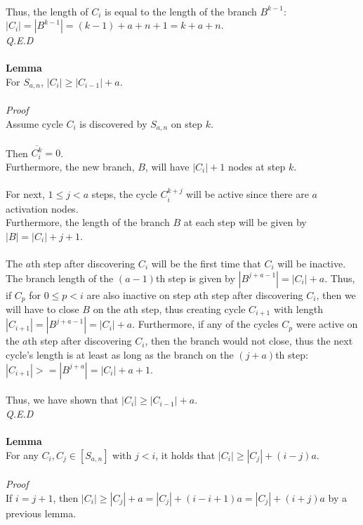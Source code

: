 \documentclass[a4paper,12pt]{article}
\begin{document}
\\ 
Thus, the length of $C_i$ is equal to the length of the branch $B^{k-1}$:\\ $|C_i| = |B^{k-1}| = (k - 1) + a + n + 1 = k + a + n$.\\
\textit{Q.E.D}\\
\\
\textbf{Lemma}\\
For $S_{a,n}$, $|C_{i}| \geq |C_{i-1}| + a$.\\
\\
\textit{Proof}\\  
Assume cycle $C_i$ is discovered by $S_{a,n}$ on step $k$.\\
\\
Then $\overline{C^k_i} = 0$.\\
Furthermore, the new branch, $B$, will have $|C_i| + 1$ nodes at step $k$.\\
\\
For next, $1 \leq j < a$ steps, the cycle  $C^{k+j}_i$ will be active since there are $a$ activation nodes.\\
Furthermore, the length of the branch $B$ at each step will be given by $|B| = |C_i| + j + 1$.\\
\\
The $a$th step after discovering $C_i$ will be the first time that $C_i$ will be inactive. The branch length of the $(a-1)$th step is given by $|B^{j + a - 1}| = |C_i| + a$. Thus, if $C_p$ for $0 \leq p < i$ are also inactive on step $a$th step after discovering $C_i$, then we will have to close $B$ on the $a$th step, thus creating cycle $C_{i+1}$ with length $|C_{i+1}| = |B^{j + a - 1}| = |C_i| + a$. Furthermore, if any of the cycles $C_p$ were active on the $a$th step after discovering $C_i$, then the branch would not close, thus the next cycle's length is at least as long as the branch on the $(j+a)$th step: $|C_{i+1}| >= |B^{j + a}| = |C_i| + a + 1$.\\
\\
Thus, we have shown that  $|C_{i}| \geq |C_{i-1}| + a$.\\
\textit{Q.E.D}\\
\\
\textbf{Lemma}\\
For any $C_i, C_j \in [S_{a,n}]$ with $j < i$, it holds that $|C_{i}| \geq |C_j| + (i - j)a$.\\
\\
\textit{Proof}\\ 
If $i = j + 1$, then $|C_i| \geq |C_j| + a = |C_j| + (i - i + 1)a = |C_j| + (i + j)a$ by a previous lemma.\\
\end{document}
